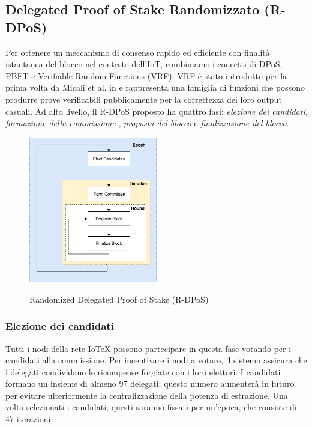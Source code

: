 \subsection{Delegated Proof of Stake Randomizzato (R-DPoS)}
Per ottenere un meccanismo di consenso rapido ed efficiente con finalità istantanea del blocco nel contesto dell'IoT, combiniamo i concetti di DPoS, PBFT e Verifiable Random Functions (VRF). VRF è stato introdotto per la prima volta da Micali et al. in \cite{c19} e rappresenta una famiglia di funzioni che possono produrre prove verificabili pubblicamente per la correttezza dei loro output casuali. Ad alto livello, il R-DPoS proposto ha quattro fasi: \emph{elezione dei candidati}, \emph{formazione della commissione }, \emph{proposta del blocco} e \emph{finalizzazione del blocco}.

\begin{figure}[ht]
	\centering
	\includegraphics[width=0.5\textwidth]{Figura6}
	\label{fig:figure6}
	\caption{Randomized Delegated Proof of Stake (R-DPoS)}
\end{figure}

\subsubsection{Elezione dei candidati}
Tutti i nodi della rete IoTeX possono partecipare in questa fase votando per i candidati alla commissione. Per incentivare i nodi a votare, il sistema assicura che i delegati condividano le ricompense forgiate con i loro elettori. I candidati formano un insieme di almeno 97 delegati; questo numero aumenterà in futuro per evitare ulteriormente la centralizzazione della potenza di estrazione. Una volta selezionati i candidati, questi saranno fissati per un'epoca,
che consiste di 47 iterazioni.

